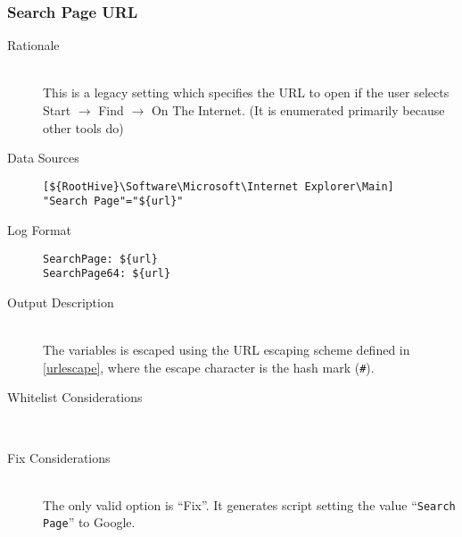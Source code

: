 \subsubsection{Search Page URL}
\begin{description}
\item[Rationale] \hfill \\ This is a legacy setting which specifies the URL to
open if the user selects Start $\rightarrow$ Find $\rightarrow$ On The Internet.
(It is enumerated primarily because other tools do)

\item[Data Sources] \hfill
\vspace{-\baselineskip}
\begin{verbatim}
[${RootHive}\Software\Microsoft\Internet Explorer\Main]
"Search Page"="${url}"
\end{verbatim}
\item[Log Format] \hfill
\vspace{-\baselineskip}
\begin{verbatim} 
SearchPage: ${url}
SearchPage64: ${url}
\end{verbatim}
\item[Output Description] \hfill \\
The variables  is escaped using the URL escaping
scheme defined in \ref{urlescape}, where the escape character is the hash mark
(\verb|#|).
\item[Whitelist Considerations] \hfill \\

\item[Fix Considerations] \hfill \\
The only valid option is ``Fix''. It generates script setting the value
``\verb|Search Page|'' to Google.
\end{description}

